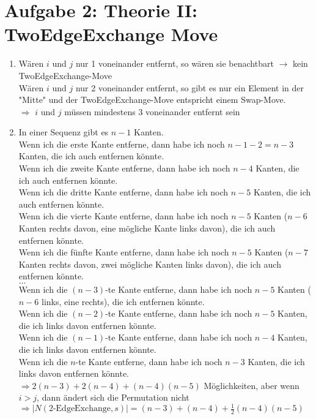 \documentclass{article}
\begin{document}
	\section*{Aufgabe 2: Theorie II: TwoEdgeExchange Move}
	\begin{enumerate}[label=(\alph*)]
		\item Wären $i$ und $j$ nur 1 voneinander entfernt, so wären sie benachtbart $\to$ kein TwoEdgeExchange-Move \\
		Wären $i$ und $j$ nur 2 voneinander entfernt, so gibt es nur ein Element in der "Mitte" und der TwoEdgeExchange-Move entspricht einem Swap-Move. \\
		$\Rightarrow$ $i$ und $j$ müssen mindestens 3 voneinander entfernt sein
		\item In einer Sequenz gibt es $n-1$ Kanten. \\
		Wenn ich die erste Kante entferne, dann habe ich noch $n-1-2 = n-3$ Kanten, die ich auch entfernen könnte. \\
		Wenn ich die zweite Kante entferne, dann habe ich noch $n-4$ Kanten, die ich auch entfernen könnte. \\
		Wenn ich die dritte Kante entferne, dann habe ich noch $n-5$ Kanten, die ich auch entfernen könnte. \\
		Wenn ich die vierte Kante entferne, dann habe ich noch $n-5$ Kanten ($n-6$ Kanten rechts davon, eine mögliche Kante links davon), die ich auch entfernen könnte. \\
		Wenn ich die fünfte Kante entferne, dann habe ich noch $n-5$ Kanten ($n-7$ Kanten rechts davon, zwei mögliche Kanten links davon), die ich auch entfernen könnte. \\
		$\dots$ \\
		Wenn ich die $(n-3)$-te Kante entferne, dann habe ich noch $n-5$ Kanten ($n-6$ links, eine rechts), die ich entfernen könnte. \\
		Wenn ich die $(n-2)$-te Kante entferne, dann habe ich noch $n-5$ Kanten, die ich links davon entfernen könnte. \\
		Wenn ich die $(n-1)$-te Kante entferne, dann habe ich noch $n-4$ Kanten, die ich links davon entfernen könnte. \\
		Wenn ich die $n$-te Kante entferne, dann habe ich noch $n-3$ Kanten, die ich links davon entfernen könnte. \\
		$\Rightarrow 2(n-3) + 2(n-4) + (n-4)(n-5)$ Möglichkeiten, aber wenn $i>j$, dann ändert sich die Permutation nicht \\
		$\Rightarrow |N(\text{2-EdgeExchange}, s)| = (n-3) + (n-4) + \frac{1}{2}(n-4)(n-5)$
	\end{enumerate}
\end{document}
